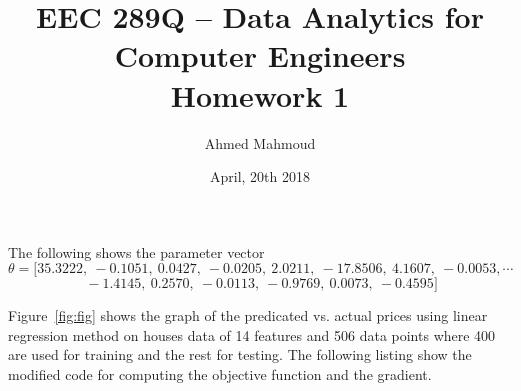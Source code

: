 \documentclass[12pt] {article}
\begin{document}
\title{EEC 289Q – Data Analytics for Computer Engineers \\ Homework 1}
\author{Ahmed Mahmoud}
\date{April, 20th 2018} 

\maketitle






The following shows the parameter vector 
$$\theta =[35.3222,\ -0.1051,\ 0.0427,\ -0.0205,\ 2.0211,\ -17.8506,\ 4.1607,\ -0.0053,\cdots$$
$$\ -1.4145,\ 0.2570,\ -0.0113,\ -0.9769,\ 0.0073,\ -0.4595]$$

Figure~\ref{fig:fig} shows the graph of the predicated vs. actual prices using linear regression method on houses data of 14 features and 506 data points where 400 are used for training and the rest for testing. The following listing show the modified code for computing the objective function and the gradient. 
\end{document}
